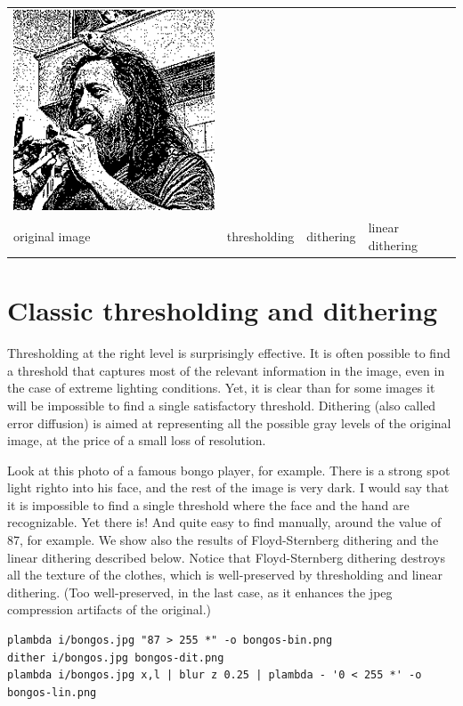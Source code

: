 \begin{tabular}{llll}
	\includegraphics{weiro-z01.png} \\
	original image &
	thresholding &
	dithering &
	linear dithering
\end{tabular}

\section{Classic thresholding and dithering}

Thresholding at the right level is surprisingly effective.  It is often
possible to find a threshold that captures most of the relevant information
in the image, even in the case of extreme lighting conditions.
Yet, it is clear than for some images it will be impossible to find a single
satisfactory threshold.
Dithering (also called error diffusion) is aimed at representing all the
possible gray levels of the original image, at the price of a small loss of
resolution.

Look at this photo of a famous bongo player, for example.  There is a strong
spot light righto into his face, and the rest of the image is very dark.  I
would say that it is impossible to find a single threshold where the face
and the hand are recognizable.  Yet there is!  And quite easy to find
manually, around the value of 87, for example.
We show also the results of Floyd-Sternberg dithering and the linear
dithering described below.  Notice that Floyd-Sternberg dithering destroys
all the texture of the clothes, which is well-preserved by thresholding and
linear dithering.  (Too well-preserved, in the last case, as it enhances the
jpeg compression artifacts of the original.)


\begin{gallery}
\end{gallery}
\begin{verbatim}
plambda i/bongos.jpg "87 > 255 *" -o bongos-bin.png
dither i/bongos.jpg bongos-dit.png
plambda i/bongos.jpg x,l | blur z 0.25 | plambda - '0 < 255 *' -o bongos-lin.png
\end{verbatim}

